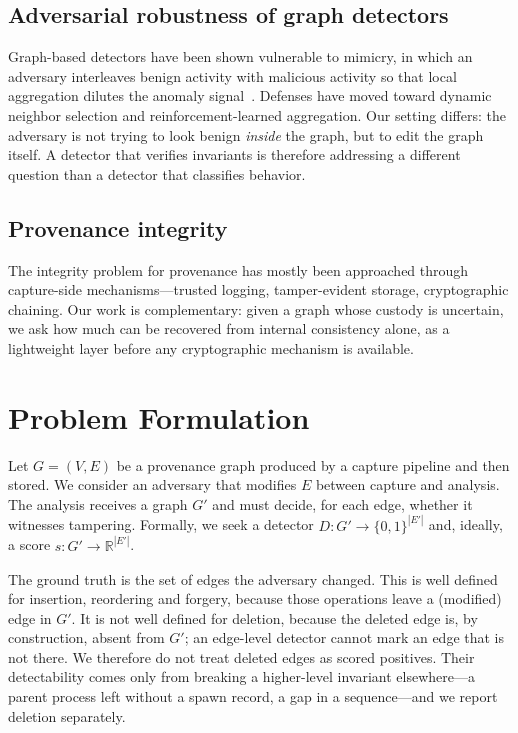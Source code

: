 \documentclass[journal]{IEEEtran}
\begin{document}
\subsection{Adversarial robustness of graph detectors}
Graph-based detectors have been shown vulnerable to mimicry, in which an
adversary interleaves benign activity with malicious activity so that local
aggregation dilutes the anomaly signal~\cite{jiang2023mimicry}. Defenses have
moved toward dynamic neighbor selection and reinforcement-learned aggregation.
Our setting differs: the adversary is not trying to look benign \emph{inside} the
graph, but to edit the graph itself. A detector that verifies invariants is
therefore addressing a different question than a detector that classifies
behavior.

\subsection{Provenance integrity}
The integrity problem for provenance has mostly been approached through
capture-side mechanisms---trusted logging, tamper-evident storage, cryptographic
chaining. Our work is complementary: given a graph whose custody is uncertain, we
ask how much can be recovered from internal consistency alone, as a lightweight
layer before any cryptographic mechanism is available.

\section{Problem Formulation}
Let $G=(V,E)$ be a provenance graph produced by a capture pipeline and then
stored. We consider an adversary that modifies $E$ between capture and analysis.
The analysis receives a graph $G'$ and must decide, for each edge, whether it
witnesses tampering. Formally, we seek a detector $D:G'\rightarrow\{0,1\}^{|E'|}$
and, ideally, a score $s:G'\rightarrow\mathbb{R}^{|E'|}$.

The ground truth is the set of edges the adversary changed. This is well defined
for insertion, reordering and forgery, because those operations leave a
(modified) edge in $G'$. It is not well defined for deletion, because the
deleted edge is, by construction, absent from $G'$; an edge-level detector
cannot mark an edge that is not there. We therefore do not treat deleted edges
as scored positives. Their detectability comes only from breaking a higher-level
invariant elsewhere---a parent process left without a spawn record, a gap in a
sequence---and we report deletion separately.
\end{document}
